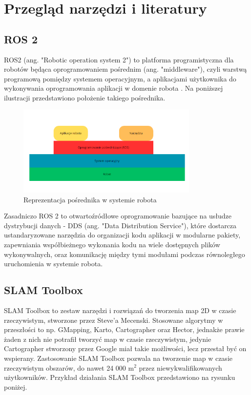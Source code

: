 \documentclass[a4paper,twoside,12pt]{book}
\begin{document}
\section{Przegląd narzędzi i literatury}
\subsection{ROS 2}
ROS2 (ang. "Robotic operation system 2") to platforma programistyczna dla robotów będąca oprogramowaniem pośrednim (ang. "middleware"), czyli warstwą programową pomiędzy systemem operacyjnym, a aplikacjami użytkownika do wykonywania oprogramowania aplikacji w domenie robota \cite{bib:ros2Concise}. Na poniższej ilustracji przedstawiono położenie takiego pośrednika.
\begin{figure}[h]
	\centering
	\includegraphics[width=0.8\textwidth]{images/middle.png}
	\caption{Reprezentacja pośrednika w systemie robota \cite{bib:ros2Concise}}
	\label{fig:middle}
	\end{figure}
\newline
Zasadniczo ROS 2 to otwartoźródłowe oprogramowanie bazujące na usłudze dystrybucji danych - DDS (ang. "Data Distribution Service"), które dostarcza ustandaryzowane narzędzia do organizacji kodu aplikacji w modularne pakiety, zapewniania współbieżnego wykonania kodu na wiele dostępnych plików wykonywalnych, oraz komunikację między tymi modułami podczas równoległego uruchomienia w systemie robota.\cite{bib:guide}

\newpage
\subsection{SLAM Toolbox}
SLAM Toolbox to zestaw narzędzi i rozwiązań do tworzenia map 2D w czasie rzeczywistym, stworzone przez Steve'a Mecenski.
 Stosowane algorytmy w przeszłości to np. GMapping, Karto, Cartographer oraz Hector, jednakże prawie żaden z nich nie potrafił tworzyć map w czasie rzeczywistym, jedynie Cartographer stworzony przez Google miał takie możliwości, lecz przestał być on wspierany.
 \cite{bib:slamtoolbox} Zastosowanie SLAM Toolbox pozwala na tworzenie map w czasie rzeczywistym obszarów, do nawet 24 000 m$^2$ przez niewykwalifikowanych użytkowników. Przykład działania SLAM Toolbox przedstawiono na rysunku poniżej.
\end{document}
